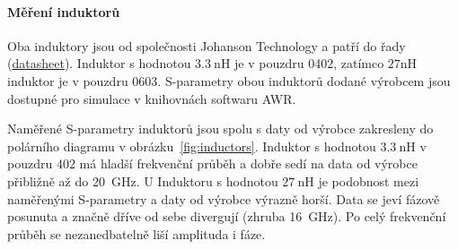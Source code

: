 \documentclass[11pt,a4paper]{article}
\begin{document}
\paragraph*{Měření induktorů} Oba induktory jsou od společnosti Johanson Technology a patří do řady  (\href{https://www.johansontechnology.com/wirewound-inductors}{datasheet}). Induktor s hodnotou $3.3\ \mathrm{nH}$ je v pouzdru 0402, zatímco $27\mathrm{nH}$ induktor je v pouzdru 0603. S-parametry obou induktorů dodané výrobcem jsou dostupné pro simulace v knihovnách softwaru AWR.

Naměřené S-parametry induktorů jsou spolu s daty od výrobce zakresleny do polárního diagramu v obrázku~\ref{fig:inductors}. Induktor s hodnotou $3.3\ \mathrm{nH}$ v pouzdru 402 má hladší frekvenční průběh a dobře sedí na data od výrobce přibližně až do 20~GHz. U Induktoru s hodnotou $27\ \mathrm{nH}$ je podobnost mezi naměřenými S-parametry a daty od výrobce výrazně horší. Data se jeví fázově posunuta a značně dříve od sebe divergují (zhruba 16~GHz). Po celý frekvenční průběh se nezanedbatelně liší amplituda i fáze.
\end{document}
